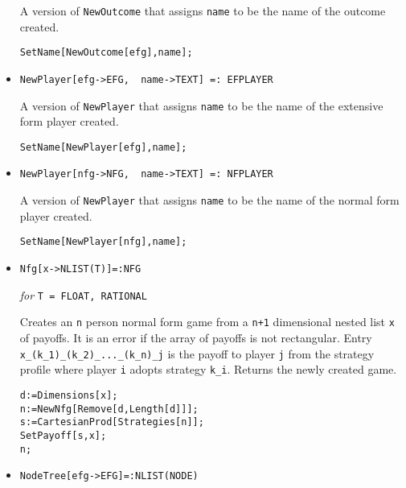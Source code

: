 \begin{itemize}
\bd 
A version of \verb+NewOutcome+ that assigns \verb+name+ to be the name
of the outcome created.  
\begin{verbatim}
SetName[NewOutcome[efg],name];
\end{verbatim} 
\ed

\item{}
\protect \large \begin{verbatim}
NewPlayer[efg->EFG,  name->TEXT] =: EFPLAYER
\end{verbatim}\normalsize

\bd 
A version of \verb+NewPlayer+ that assigns \verb+name+ to be the name
of the extensive form player created.  
\begin{verbatim}
SetName[NewPlayer[efg],name];
\end{verbatim} 
\ed

\item{}
\protect \large \begin{verbatim}
NewPlayer[nfg->NFG,  name->TEXT] =: NFPLAYER
\end{verbatim}\normalsize

\bd 
A version of \verb+NewPlayer+ that assigns \verb+name+ to be the name
of the normal form player created.  
\begin{verbatim}
SetName[NewPlayer[nfg],name];
\end{verbatim} 
\ed

\item{}
\protect \large \begin{verbatim}
Nfg[x->NLIST(T)]=:NFG
\end{verbatim}\normalsize

{\it for} {\tt T = FLOAT, RATIONAL}
\bd 

Creates an \verb+n+ person normal form game from a \verb&n+1&
dimensional nested list \verb+x+ of payoffs.  It is an error if the
array of payoffs is not rectangular.  Entry
\verb+x_(k_1)_(k_2)_..._(k_n)_j+ is the payoff to player \verb+j+ from
the strategy profile where player \verb+i+ adopts strategy \verb+k_i+.
Returns the newly created game.

\begin{verbatim}
d:=Dimensions[x];
n:=NewNfg[Remove[d,Length[d]]];
s:=CartesianProd[Strategies[n]];
SetPayoff[s,x];
n;
\end{verbatim} 
\ed


\item{}
\protect \large \begin{verbatim}
NodeTree[efg->EFG]=:NLIST(NODE)
\end{verbatim}\normalsize


\end{itemize}
